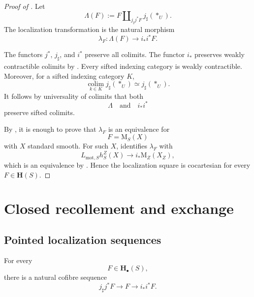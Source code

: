 \begin{proof}[Proof of ]
Let
\[
    \Lambda(F)
    :=
    F
    \amalg_{j_\sharp j^*F}
    j_\sharp(*_U).
\]
The localization transformation is the natural morphism
\[
    \lambda_F
    \colon
    \Lambda(F)
    \longrightarrow
    i_*i^*F.
\]

The functors \(j^*\), \(j_\sharp\), and \(i^*\) preserve all colimits.
The functor \(i_*\) preserves weakly contractible colimits by
.  Every
sifted indexing category is weakly contractible.  Moreover, for a
sifted indexing category \(K\),
\[
    \operatorname*{colim}_{k\in K}j_\sharp(*_U)
    \simeq
    j_\sharp(*_U).
\]
It follows by universality of colimits that both
\[
    \Lambda
    \quad\text{and}\quad
    i_*i^*
\]
preserve sifted colimits.

By , it is enough to
prove that \(\lambda_F\) is an equivalence for
\[
    F
    =
    \mathrm M_S(X)
\]
with \(X\) standard smooth.  For such \(X\),
 identifies \(\lambda_F\)
with
\[
    L_{\mathrm{mot},S}h_S^Z(X)
    \longrightarrow
    i_*\mathrm M_Z(X_Z),
\]
which is an equivalence by
.  Hence the localization
square is cocartesian for every \(F\in\mathbf H(S)\).
\end{proof}

\section{Closed recollement and exchange}
\label{sec:closed-recollement-exchange}

\subsection{Pointed localization sequences}

\begin{theorem}
\label{thm:pointed-localization-cofiber-sequence}
For every
\[
    F
    \in
    \mathbf H_\bullet(S),
\]
there is a natural cofibre sequence
\[
    j_\sharp j^*F
    \longrightarrow
    F
    \longrightarrow
    i_*i^*F.
\]
\end{theorem}

